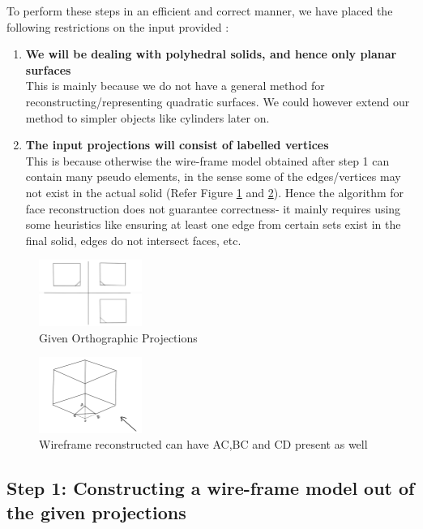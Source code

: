 \documentclass[12pt,a4paper]{article}
\begin{document}
To perform these steps in an efficient and  correct manner, we have placed the following restrictions on the input provided :
\begin{enumerate}
    \item  \textbf{We will be dealing with polyhedral solids, and hence only planar surfaces}  \hfill \\
This is mainly because we do not have a general method for reconstructing/representing quadratic surfaces. We could however extend our method to simpler objects like cylinders later on.
        \item  \textbf{The input projections will consist of labelled vertices} \hfill \\
This is because otherwise the wire-frame model obtained after step 1 can contain many pseudo elements, in the sense some of the edges/vertices may not exist in the actual solid (Refer Figure \ref{fig:ortho} and \ref{fig:solid}). Hence the algorithm for face reconstruction does not guarantee correctness- it mainly requires using some heuristics like  ensuring at least one edge from certain sets exist in the final solid, edges do not intersect faces, etc.
\end{enumerate}
\begin{figure}
\centering
\includegraphics[width=0.3\textwidth]{Orthograph.png}
\caption{\label{fig:ortho}Given Orthographic Projections}
\end{figure}

\begin{figure}
\centering
\includegraphics[width=0.3\textwidth]{Wireframe.png}
\caption{\label{fig:solid}Wireframe reconstructed can have AC,BC and CD present as well}
\end{figure}


\subsection{Step 1: Constructing a wire-frame model out of the given projections}
\end{document}
